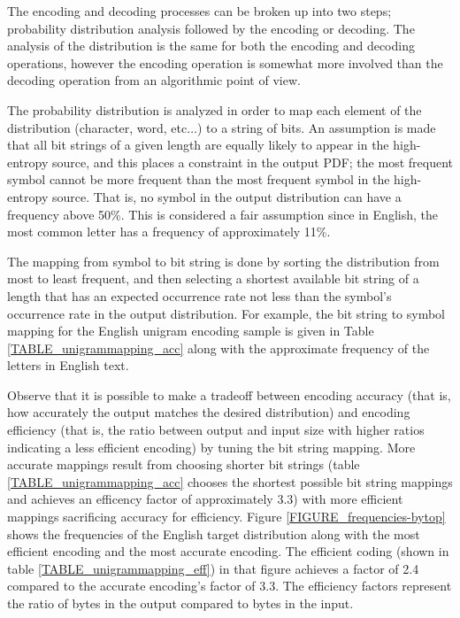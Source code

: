 \documentclass[12pt]{report}
\theoremstyle{remark}
\theoremstyle{definition}
\theoremstyle{definition}
\theoremstyle{definition}
\begin{document}
\begin{appendices}
The encoding and decoding processes can be broken up into two steps; probability
distribution analysis followed by the encoding or decoding. The analysis of the
distribution is the same for both the encoding and decoding operations, however
the encoding operation is somewhat more involved than the decoding operation
from an algorithmic point of view.

The probability distribution is analyzed in order to map each element of the
distribution (character, word, etc$\ldots$) to a string of bits. An assumption
is made that all bit strings of a given length are equally likely to appear in
the high-entropy source, and this places a constraint in the output PDF; the
most frequent symbol cannot be more frequent than the most frequent symbol in
the high-entropy source. That is, no symbol in the output distribution can have
a frequency above 50\%. This is considered a fair assumption since in English,
the most common letter has a frequency of approximately 11\%.

The mapping from symbol to bit string is done by sorting the distribution from
most to least frequent, and then selecting a shortest available bit string of a
length that has an expected occurrence rate not less than the symbol's
occurrence rate in the output distribution. For example, the bit string to
symbol mapping for the English unigram encoding sample is given in Table
\ref{TABLE_unigrammapping_acc} along with the approximate frequency of the letters
in English text.

Observe that it is possible to make a tradeoff between encoding accuracy (that
is, how accurately the output matches the desired distribution) and encoding
efficiency (that is, the ratio between output and input size with higher ratios
indicating a less efficient encoding) by tuning the bit string mapping. More
accurate mappings result from choosing shorter bit strings (table
\ref{TABLE_unigrammapping_acc} chooses the shortest possible bit string mappings and
achieves an efficency factor of approximately 3.3) with more efficient mappings
sacrificing accuracy for efficiency. Figure \ref{FIGURE_frequencies-bytop} shows
the frequencies of the English target distribution along with the most efficient
encoding and the most accurate encoding. The efficient coding (shown in table \ref{TABLE_unigrammapping_eff}) in that figure
achieves a factor of 2.4 compared to the accurate encoding's factor of 3.3.
The efficiency factors represent the ratio of bytes in the output compared to
bytes in the input.


\end{appendices}
\end{document}
